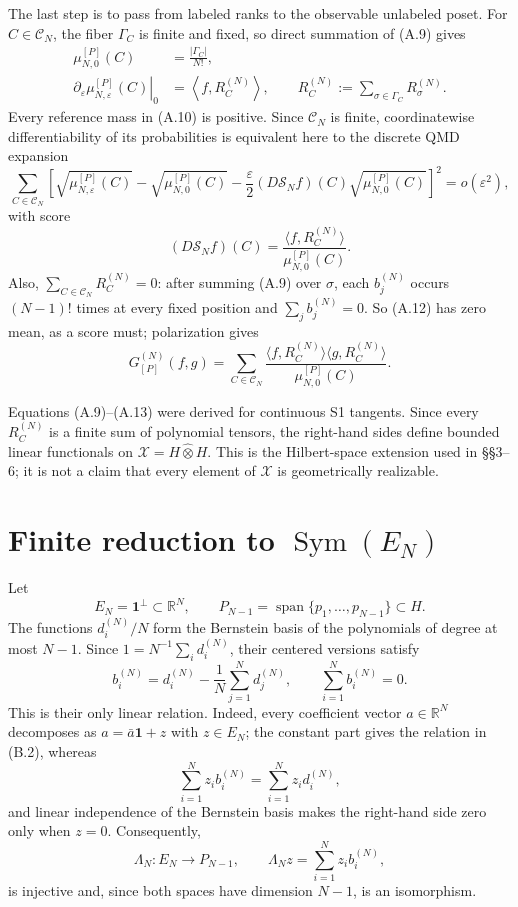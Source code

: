 \documentclass[11pt]{article}
\begin{document}
The last step is to pass from labeled ranks to the observable unlabeled poset. For \(C\in\mathcal C_N\), the fiber \(\Gamma_C\) is finite and fixed, so direct summation of (A.9) gives \[ \begin{aligned} \mu_{N,0}^{[P]}(C)&=\frac{|\Gamma_C|}{N!},\\ \left.\partial_\varepsilon \mu_{N,\varepsilon}^{[P]}(C)\right|_0 &=\left\langle f,R_C^{(N)}\right\rangle, \qquad R_C^{(N)}:=\sum_{\sigma\in\Gamma_C}R_\sigma^{(N)}. \end{aligned} \tag{A.10} \] Every reference mass in (A.10) is positive. Since \(\mathcal C_N\) is finite, coordinatewise differentiability of its probabilities is equivalent here to the discrete QMD expansion \[ \sum_{C\in\mathcal C_N} \left[ \sqrt{\mu_{N,\varepsilon}^{[P]}(C)} -\sqrt{\mu_{N,0}^{[P]}(C)} -\frac{\varepsilon}{2} (D\mathscr S_Nf)(C) \sqrt{\mu_{N,0}^{[P]}(C)} \right]^2 =o(\varepsilon^2), \tag{A.11} \] with score \[ (D\mathscr S_Nf)(C) =\frac{\langle f,R_C^{(N)}\rangle} {\mu_{N,0}^{[P]}(C)}. \tag{A.12} \] Also, \(\sum_{C\in\mathcal C_N}R_C^{(N)}=0\): after summing (A.9) over \(\sigma\), each \(b_j^{(N)}\) occurs \((N-1)!\) times at every fixed position and \(\sum_jb_j^{(N)}=0\). So (A.12) has zero mean, as a score must; polarization gives \[ G_{[P]}^{(N)}(f,g) =\sum_{C\in\mathcal C_N} \frac{\langle f,R_C^{(N)}\rangle \langle g,R_C^{(N)}\rangle} {\mu_{N,0}^{[P]}(C)}. \tag{A.13} \]

Equations (A.9)--(A.13) were derived for continuous S1 tangents. Since every \(R_C^{(N)}\) is a finite sum of polynomial tensors, the right-hand sides define bounded linear functionals on \(\mathcal X=H\widehat\otimes H\). This is the Hilbert-space extension used in \S\S3--6; it is not a claim that every element of \(\mathcal X\) is geometrically realizable.

\section{Finite reduction to $\operatorname{Sym}(E_N)$}

Let \[ E_N=\mathbf1^\perp\subset\mathbb R^N, \qquad P_{N-1}=\operatorname{span}\{p_1,\ldots,p_{N-1}\} \subset H. \tag{B.1} \] The functions \(d_i^{(N)}/N\) form the Bernstein basis of the polynomials of degree at most \(N-1\). Since \(1=N^{-1}\sum_i d_i^{(N)}\), their centered versions satisfy \[ b_i^{(N)} =d_i^{(N)}-\frac1N\sum_{j=1}^Nd_j^{(N)}, \qquad \sum_{i=1}^Nb_i^{(N)}=0. \tag{B.2} \] This is their only linear relation. Indeed, every coefficient vector \(a\in\mathbb R^N\) decomposes as \(a=\bar a\mathbf1+z\) with \(z\in E_N\); the constant part gives the relation in (B.2), whereas \[ \sum_{i=1}^Nz_i b_i^{(N)} =\sum_{i=1}^Nz_i d_i^{(N)}, \tag{B.3} \] and linear independence of the Bernstein basis makes the right-hand side zero only when \(z=0\). Consequently, \[ \Lambda_N:E_N\longrightarrow P_{N-1}, \qquad \Lambda_Nz=\sum_{i=1}^Nz_i b_i^{(N)}, \tag{B.4} \] is injective and, since both spaces have dimension \(N-1\), is an isomorphism.
\end{document}
